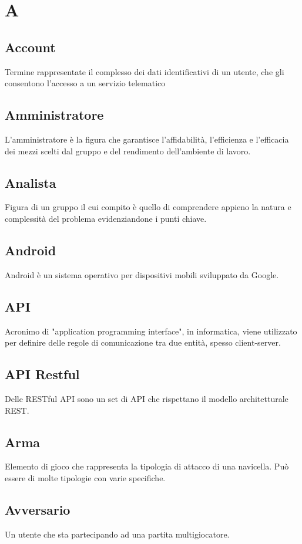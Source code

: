 \section{A}
	\subsection{Account}
		Termine rappresentate il complesso dei dati identificativi di un utente, che gli consentono l'accesso a un servizio telematico
	\subsection{Amministratore}  
		L'amministratore è la figura che garantisce l’affidabilità, l’efficienza e l’efficacia dei mezzi scelti dal gruppo e del rendimento dell’ambiente di lavoro.
	\subsection{Analista}  
		Figura di un gruppo il cui compito è quello di comprendere appieno la natura e complessità del problema evidenziandone i punti chiave.
    \subsection{Android}
        Android è un sistema operativo per dispositivi mobili sviluppato da Google.
	\subsection{API}  
		Acronimo di "application programming interface", in informatica, viene utilizzato per definire delle regole di comunicazione tra due entità, spesso client-server.
	\subsection{API Restful}  
		Delle RESTful API sono un set di API che rispettano il modello architetturale REST.
    \subsection{Arma}
        Elemento di gioco che rappresenta la tipologia di attacco di una navicella. Può essere di molte tipologie con varie specifiche.
	\subsection{Avversario}
	    Un utente che sta partecipando ad una partita multigiocatore.
